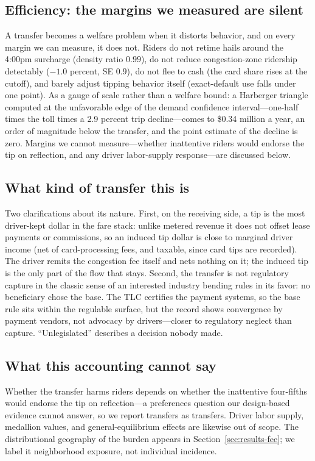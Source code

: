 \subsection{Efficiency: the margins we measured are silent}
A transfer becomes a welfare problem when it distorts behavior, and on
every margin we can measure, it does not. Riders do not retime hails
around the 4:00pm surcharge (density ratio $0.99$), do not reduce
congestion-zone ridership detectably ($-1.0$ percent, SE $0.9$), do
not flee to cash (the card share rises at the cutoff), and barely
adjust tipping behavior itself (exact-default use falls under one
point). As a gauge of scale rather than a welfare bound: a Harberger
triangle computed at the unfavorable edge of the demand confidence
interval---one-half times the toll times a 2.9 percent trip
decline---comes to \$0.34 million a year, an order of magnitude below
the transfer, and the point estimate of the decline is zero. Margins we
cannot measure---whether inattentive riders would endorse the tip on
reflection, and any driver labor-supply response---are discussed below.

\subsection{What kind of transfer this is}
Two clarifications about its nature. First, on the receiving side, a
tip is the most driver-kept dollar in the fare stack: unlike metered
revenue it does not offset lease payments or commissions, so an induced
tip dollar is close to marginal driver income (net of card-processing
fees, and taxable, since card tips are recorded). The driver remits the
congestion fee itself and nets nothing on it; the induced tip is the
only part of the flow that stays. Second, the transfer is not
regulatory capture in the classic sense of an interested industry
bending rules in its favor: no beneficiary chose the base. The TLC
certifies the payment systems, so the base rule sits within the
regulable surface, but the record shows convergence by payment vendors,
not advocacy by drivers---closer to regulatory neglect than capture.
``Unlegislated'' describes a decision nobody made.

\subsection{What this accounting cannot say}
Whether the transfer harms riders depends on whether the inattentive
four-fifths would endorse the tip on reflection---a preferences
question our design-based evidence cannot answer, so we report
transfers as transfers. Driver labor supply, medallion values, and
general-equilibrium effects are likewise out of scope. The
distributional geography of the burden appears in
Section~\ref{sec:results-fee}; we label it neighborhood exposure, not
individual incidence.
